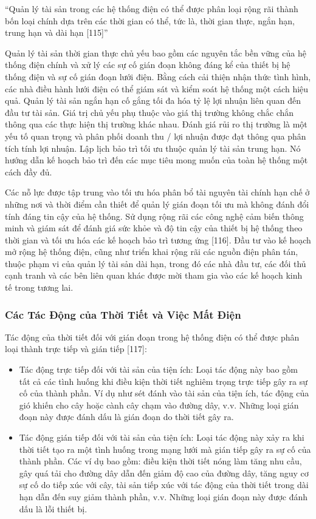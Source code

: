 \documentclass[utf8]{frontiersSCNS} %
\begin{document}
“Quản lý tài sản trong các hệ thống điện có thể được phân loại rộng rãi thành bốn loại chính dựa trên các thời gian có thể, tức là, thời gian thực, ngắn hạn, trung hạn và dài hạn [115]”

Quản lý tài sản thời gian thực chủ yếu bao gồm các nguyên tắc bền vững của hệ thống điện chính và xử lý các sự cố gián đoạn không đáng kể của thiết bị hệ thống điện và sự cố gián đoạn lưới điện. Bằng cách cải thiện nhận thức tình hình, các nhà điều hành lưới điện có thể giám sát và kiểm soát hệ thống một cách hiệu quả. Quản lý tài sản ngắn hạn cố gắng tối đa hóa tỷ lệ lợi nhuận liên quan đến đầu tư tài sản. Giá trị chủ yếu phụ thuộc vào giá thị trường không chắc chắn thông qua các thực hiện thị trường khác nhau. Đánh giá rủi ro thị trường là một yếu tố quan trọng và phân phối doanh thu / lợi nhuận được đạt thông qua phân tích tính lợi nhuận. Lập lịch bảo trì tối ưu thuộc quản lý tài sản trung hạn. Nó hướng dẫn kế hoạch bảo trì đến các mục tiêu mong muốn của toàn hệ thống một cách đầy đủ.

Các nỗ lực được tập trung vào tối ưu hóa phân bổ tài nguyên tài chính hạn chế ở những nơi và thời điểm cần thiết để quản lý gián đoạn tối ưu mà không đánh đổi tính đáng tin cậy của hệ thống. Sử dụng rộng rãi các công nghệ cảm biến thông minh và giám sát để đánh giá sức khỏe và độ tin cậy của thiết bị hệ thống theo thời gian và tối ưu hóa các kế hoạch bảo trì tương ứng [116]. Đầu tư vào kế hoạch mở rộng hệ thống điện, cũng như triển khai rộng rãi các nguồn điện phân tán, thuộc phạm vi của quản lý tài sản dài hạn, trong đó các nhà đầu tư, các đối thủ cạnh tranh và các bên liên quan khác được mời tham gia vào các kế hoạch kinh tế trong tương lai.



\subsubsection{Các Tác Động của Thời Tiết và Việc Mất Điện}
Tác động của thời tiết đối với gián đoạn trong hệ thống điện có thể được phân loại thành trực tiếp và gián tiếp [117]:

\begin{itemize}
\item Tác động trực tiếp đối với tài sản của tiện ích: Loại tác động này bao gồm tất cả các tình huống khi điều kiện thời tiết nghiêm trọng trực tiếp gây ra sự cố của thành phần. Ví dụ như sét đánh vào tài sản của tiện ích, tác động của gió khiến cho cây hoặc cành cây chạm vào đường dây, v.v. Những loại gián đoạn này được đánh dấu là gián đoạn do thời tiết gây ra.

\item Tác động gián tiếp đối với tài sản của tiện ích: Loại tác động này xảy ra khi thời tiết tạo ra một tình huống trong mạng lưới mà gián tiếp gây ra sự cố của thành phần. Các ví dụ bao gồm: điều kiện thời tiết nóng làm tăng nhu cầu, gây quá tải cho đường dây dẫn đến giảm độ cao của đường dây, tăng nguy cơ sự cố do tiếp xúc với cây, tài sản tiếp xúc với tác động của thời tiết trong dài hạn dẫn đến suy giảm thành phần, v.v. Những loại gián đoạn này được đánh dấu là lỗi thiết bị.

\end{itemize}
\end{document}

